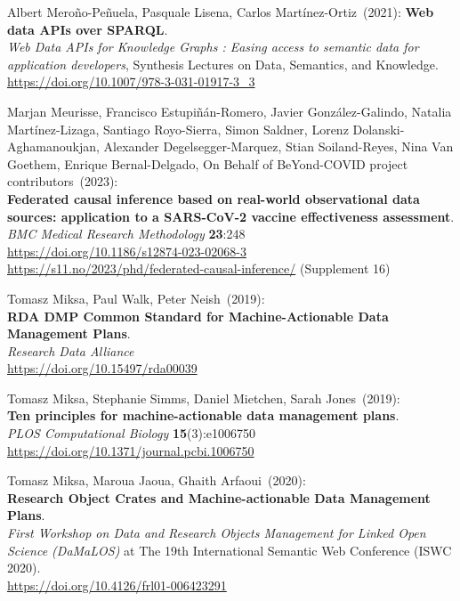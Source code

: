 \begin{thebibliography}{9}
Albert Meroño-Peñuela, Pasquale Lisena, Carlos Martínez-Ortiz~(2021):
\textbf{Web data APIs over {SPARQL}}. \\
\emph{Web Data APIs for Knowledge Graphs : Easing access to semantic data for application developers}, 
Synthesis Lectures on Data, Semantics, and Knowledge.\\
\url{https://doi.org/10.1007/978-3-031-01917-3_3}

Marjan Meurisse, Francisco Estupiñán-Romero, Javier González-Galindo, Natalia Martínez-Lizaga, Santiago Royo-Sierra, Simon Saldner, Lorenz Dolanski-Aghamanoukjan, Alexander Degelsegger-Marquez, Stian Soiland-Reyes, Nina Van Goethem, Enrique Bernal-Delgado, On Behalf of BeYond-COVID project contributors~(2023): \\
\textbf{Federated causal inference based on real-world observational data sources: application to a SARS-CoV-2 vaccine effectiveness assessment}.  \\
\emph{BMC Medical Research Methodology} \textbf{23}:248\\
\url{https://doi.org/10.1186/s12874-023-02068-3}\\
\url{https://s11.no/2023/phd/federated-causal-inference/}
(Supplement 16)

Tomasz Miksa, Paul Walk, Peter Neish~(2019): \\
\textbf{RDA DMP Common Standard for Machine-Actionable Data Management
Plans}.\\
\emph{Research Data Alliance}\\
\url{https://doi.org/10.15497/rda00039}

Tomasz Miksa, Stephanie Simms, Daniel Mietchen, Sarah Jones~(2019): \\
\textbf{Ten principles for machine-actionable data management plans}.\\
\emph{PLOS Computational Biology} \textbf{15}(3):e1006750\\
\url{https://doi.org/10.1371/journal.pcbi.1006750}

Tomasz Miksa, Maroua Jaoua, Ghaith Arfaoui~(2020): \\
\textbf{Research Object Crates and Machine-actionable Data Management
Plans}.\\
\emph{First Workshop on Data and Research Objects Management for Linked
Open Science (DaMaLOS)} at The 19th International Semantic Web
Conference (ISWC 2020).\\
\url{https://doi.org/10.4126/frl01-006423291}


\end{thebibliography}
